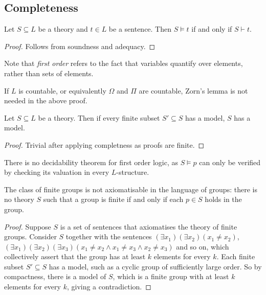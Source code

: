 \subsection{Completeness}
\begin{theorem}
    Let \( S \subseteq L \) be a theory and \( t \in L \) be a sentence.
    Then \( S \models t \) if and only if \( S \vdash t \).
\end{theorem}
\begin{proof}
    Follows from soundness and adequacy.
\end{proof}
Note that \emph{first order} refers to the fact that variables quantify over elements, rather than sets of elements.
\begin{remark}
    If \( L \) is countable, or equivalently \( \Omega \) and \( \Pi \) are countable, Zorn's lemma is not needed in the above proof.
\end{remark}
\begin{theorem}
    Let \( S \subseteq L \) be a theory.
    Then if every finite subset \( S' \subseteq S \) has a model, \( S \) has a model.
\end{theorem}
\begin{proof}
    Trivial after applying completness as proofs are finite.
\end{proof}
There is no decidability theorem for first order logic, as \( S \models p \) can only be verified by checking its valuation in every \( L \)-structure.
\begin{corollary}
    The class of finite groups is not axiomatisable in the language of groups: there is no theory \( S \) such that a group is finite if and only if each \( p \in S \) holds in the group.
\end{corollary}
\begin{proof}
    Suppose \( S \) is a set of sentences that axiomatises the theory of finite groups.
    Consider \( S \) together with the sentences \( (\exists x_1)(\exists x_2)(x_1 \neq x_2) \), \( (\exists x_1)(\exists x_2)(\exists x_3)(x_1 \neq x_2 \wedge x_1 \neq x_3 \wedge x_2 \neq x_3) \) and so on, which collectively assert that the group has at least \( k \) elements for every \( k \).
    Each finite subset \( S' \subseteq S \) has a model, such as a cyclic group of sufficiently large order.
    So by compactness, there is a model of \( S \), which is a finite group with at least \( k \) elements for every \( k \), giving a contradiction.
\end{proof}
